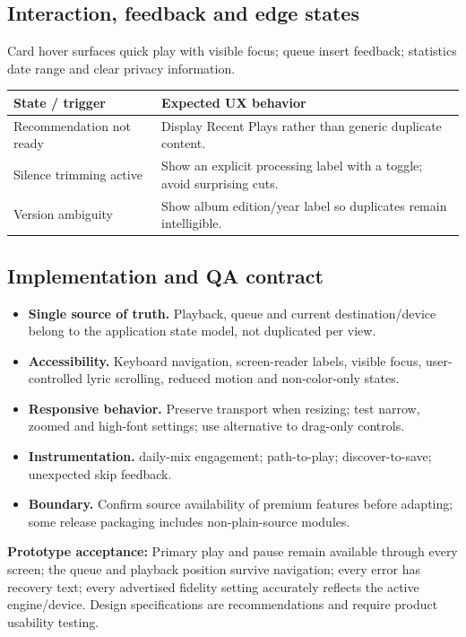 \documentclass[10pt,a4paper,oneside]{report}
\begin{document}
\subsection*{Interaction, feedback and edge states}
Card hover surfaces quick play with visible focus; queue insert feedback; statistics date range and clear privacy information.\par
\begin{tabularx}{\linewidth}{@{}p{39mm}X@{}}\toprule State / trigger & Expected UX behavior\\\midrule
Recommendation not ready & Display Recent Plays rather than generic duplicate content.\\
Silence trimming active & Show an explicit processing label with a toggle; avoid surprising cuts.\\
Version ambiguity & Show album edition/year label so duplicates remain intelligible.\\
\bottomrule\end{tabularx}
\subsection*{Implementation and QA contract}
\begin{itemize}[leftmargin=*,itemsep=2pt,topsep=2pt]
\item \textbf{Single source of truth.} Playback, queue and current destination/device belong to the application state model, not duplicated per view.
\item \textbf{Accessibility.} Keyboard navigation, screen-reader labels, visible focus, user-controlled lyric scrolling, reduced motion and non-color-only states.
\item \textbf{Responsive behavior.} Preserve transport when resizing; test narrow, zoomed and high-font settings; use alternative to drag-only controls.
\item \textbf{Instrumentation.} daily-mix engagement; path-to-play; discover-to-save; unexpected skip feedback.
\item \textbf{Boundary.} Confirm source availability of premium features before adapting; some release packaging includes non-plain-source modules.
\end{itemize}
\vspace{2mm}\begin{evidencebox}\small\textbf{Prototype acceptance:} Primary play and pause remain available through every screen; the queue and playback position survive navigation; every error has recovery text; every advertised fidelity setting accurately reflects the active engine/device. Design specifications are recommendations and require product usability testing.\end{evidencebox}
\clearpage
\end{document}
